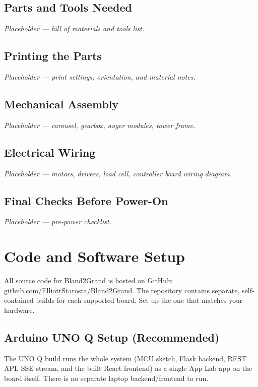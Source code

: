 \documentclass[11pt, letterpaper]{article}
\begin{document}
\subsection{Parts and Tools Needed}
\textit{Placeholder --- bill of materials and tools list.}

\subsection{Printing the Parts}
\textit{Placeholder --- print settings, orientation, and material notes.}

\subsection{Mechanical Assembly}
\textit{Placeholder --- carousel, gearbox, auger modules, tower frame.}

\subsection{Electrical Wiring}
\textit{Placeholder --- motors, drivers, load cell, controller board wiring diagram.}

\subsection{Final Checks Before Power-On}
\textit{Placeholder --- pre-power checklist.}

\section{Code and Software Setup}
\label{sec:code-setup}

All source code for Bland2Grand is hosted on GitHub: \href{https://github.com/ElliottStarosta/Bland2Grand}{\textcolor{terracottadark}{\url{github.com/ElliottStarosta/Bland2Grand}}}. The repository contains separate, self-contained builds for each supported board. Set up the one that matches your hardware.

\subsection{Arduino UNO Q Setup (Recommended)}
\label{sec:unoq-setup}

The UNO Q build runs the whole system (MCU sketch, Flask backend, REST API, SSE stream, and the built React frontend) as a single App Lab app on the board itself. There is no separate laptop backend/frontend to run.
\end{document}
